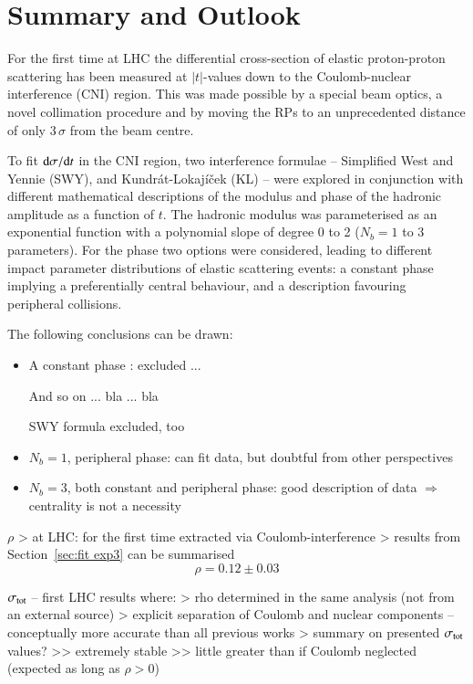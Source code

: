 \section{Summary and Outlook}
\label{sec:summary}
For the first time at LHC the differential cross-section of elastic proton-proton scattering has been measured at $|t|$-values down to the Coulomb-nuclear interference (CNI) region. This was made possible by a special beam optics, a novel collimation procedure and by moving the RPs to an unprecedented distance of only 
$3\,\sigma$ from the beam centre.

To fit ${\rm d}\sigma/{\rm d} t$ in the CNI region, two interference formulae --
Simplified West and Yennie (SWY), and Kundr\' at-Lokaj\' i\v cek (KL) -- 
were explored in 
conjunction with different mathematical descriptions of the modulus and phase 
of the hadronic amplitude as a function of $t$. The hadronic modulus was parameterised as an exponential function with a polynomial slope of degree 0 to 2 ($N_b=1$ to 3 parameters).
For the phase two options were considered, leading to different impact 
parameter distributions of elastic scattering events: a constant phase implying a preferentially central behaviour, and a description favouring peripheral collisions.


The following conclusions can be drawn:
\begin{itemize}
\item A constant phase : excluded ...

And so on ... bla ... bla 

SWY formula excluded, too
\item $N_b=1$, peripheral phase: can fit data, but doubtful from other perspectives
\item $N_b=3$, both constant and peripheral phase: good description of data $\Rightarrow$ centrality is not a necessity
\end{itemize}

\> $\rho$
\>> at LHC: for the first time extracted via Coulomb-interference
\>> results from Section~\ref{sec:fit exp3} can be summarised
\begin{equation}
\label{eq:rho final}
\rho = 0.12 \pm 0.03
\end{equation}

\> $\sigma_{\rm tot}$ -- first LHC results where:
\>> rho determined in the same analysis (not from an external source)
\>> explicit separation of Coulomb and nuclear components -- conceptually more accurate than all previous works
\>> summary on presented $\sigma_{\rm tot}$ values?
\>>> extremely stable
\>>> little greater than if Coulomb neglected (expected as long as $\rho > 0$)

